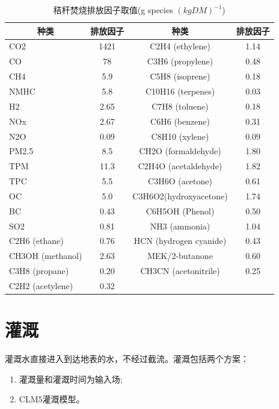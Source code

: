 \begin{table}[]
  \centering
  \caption{秸秆焚烧排放因子取值(g species $(kg DM)^{-1}$)}
  \label{tab:秸秆焚烧排放因子取值}
  \begin{tabular}{@{}lccc@{}}
  \toprule
  \multicolumn{1}{c}{种类} & 排放因子 & 种类                     & 排放因子 \\ \midrule
  CO2                    & 1421 & C2H4   (ethylene)      & 1.14 \\
  CO                     & 78   & C3H6   (propylene)     & 0.48 \\
  CH4                    & 5.9  & C5H8   (isoprene)      & 0.18 \\
  NMHC                   & 5.8  & C10H16   (terpenes)    & 0.03 \\
  H2                     & 2.65 & C7H8   (toluene)       & 0.18 \\
  NOx                    & 2.67 & C6H6   (benzene)       & 0.31 \\
  N2O                    & 0.09 & C8H10   (xylene)       & 0.09 \\
  PM2.5                  & 8.5  & CH2O   (formaldehyde)  & 1.80 \\
  TPM                    & 11.3 & C2H4O   (acetaldehyde) & 1.82 \\
  TPC                    & 5.5  & C3H6O   (acetone)      & 0.61 \\
  OC                     & 5.0  & C3H6O2(hydroxyacetone) & 1.74 \\
  BC                     & 0.43 & C6H5OH   (Phenol)      & 0.50 \\
  SO2                    & 0.81 & NH3 (ammonia)          & 1.04 \\
  C2H6   (ethane)        & 0.76 & HCN (hydrogen cyanide) & 0.43 \\
  CH3OH   (methanol)     & 2.63 & MEK/2-butanone         & 0.60 \\
  C3H8   (propane)       & 0.20 & CH3CN   (acetonitrile) & 0.25 \\
  C2H2   (acetylene)     & 0.32 &                        &      \\ \bottomrule
  \end{tabular}
  \end{table}


\section{灌溉}
灌溉水直接进入到达地表的水，不经过截流。灌溉包括两个方案：
\begin{enumerate}
  \item 灌溉量和灌溉时间为输入场;
  \item CLM5灌溉模型。
\end{enumerate}
